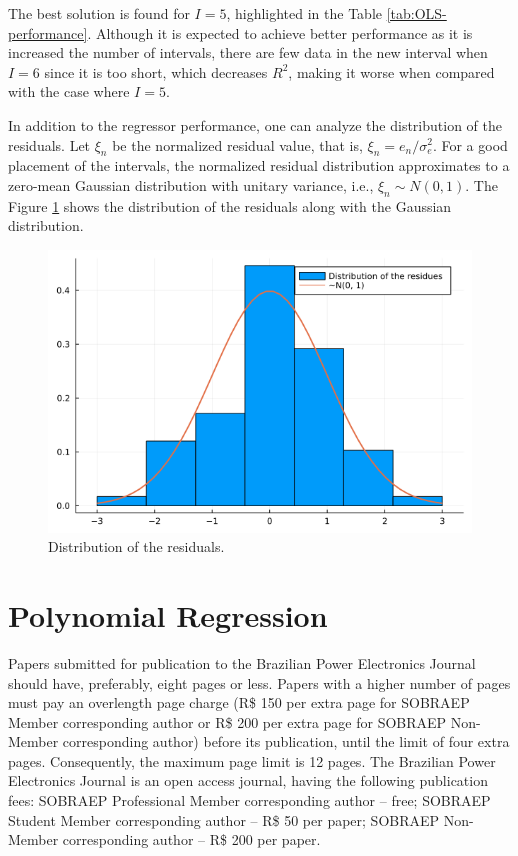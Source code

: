 \documentclass[english]{sobraep}
\begin{document}
The best solution is found for \(I=5\), highlighted in the Table \ref{tab:OLS-performance}. Although it is expected to achieve better performance as it is increased the number of intervals, there are few data in the new interval when \(I=6\) since it is too short, which decreases \(R^2\), making it worse when compared with the case where \(I=5\).

In addition to the regressor performance, one can analyze the distribution of the residuals. Let \(\xi_n\) be the normalized residual value, that is, \(\xi_n = e_n/\sigma_e^2\). For a good placement of the intervals, the normalized residual distribution approximates to a zero-mean Gaussian distribution with unitary variance, i.e., \(\xi_n \sim N(0, 1)\). The Figure \ref{fig:distribution} shows the distribution of the residuals along with the Gaussian distribution.

\begin{figure}
    \centering
    \includegraphics[scale=0.35]{../figs/residues_PDF_I5i1.png}
    \caption{Distribution of the residuals.}
    \label{fig:distribution}
\end{figure}

\section{Polynomial Regression}

Papers submitted for publication to the Brazilian Power Electronics Journal should have, preferably, eight pages or less. Papers with a higher number of pages must pay an overlength page charge (R\$ 150 per extra page for SOBRAEP Member corresponding author or R\$ 200 per extra page for SOBRAEP Non-Member corresponding author) before its publication, until the limit of four extra pages. Consequently, the maximum page limit is 12 pages.
The Brazilian Power Electronics Journal is an open access journal, having the following publication fees: SOBRAEP Professional Member corresponding author – free; SOBRAEP Student Member corresponding author – R\$ 50 per paper; SOBRAEP Non-Member corresponding author – R\$ 200 per paper.
\end{document}
